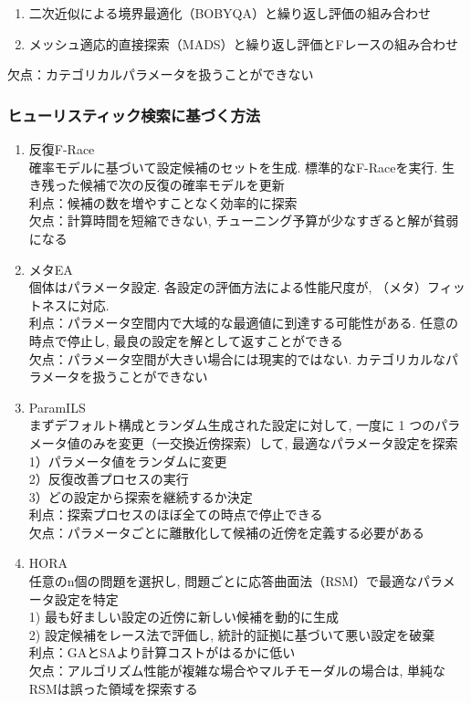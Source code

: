 \documentclass[twocolumn]{jarticle}     %
\begin{document}
\begin{enumerate}
  \item 二次近似による境界最適化（BOBYQA）と繰り返し評価の組み合わせ
  \item メッシュ適応的直接探索（MADS）と繰り返し評価とFレースの組み合わせ
\end{enumerate}

欠点：カテゴリカルパラメータを扱うことができない

\subsubsection{ヒューリスティック検索に基づく方法}

\begin{enumerate}
  \item 反復F-Race \\
  確率モデルに基づいて設定候補のセットを生成.
  標準的なF-Raceを実行.
  生き残った候補で次の反復の確率モデルを更新\\
  利点：候補の数を増やすことなく効率的に探索\\
  欠点：計算時間を短縮できない, チューニング予算が少なすぎると解が貧弱になる

  \item メタEA \\
  個体はパラメータ設定.
  各設定の評価方法による性能尺度が, （メタ）フィットネスに対応. \\
  利点：パラメータ空間内で大域的な最適値に到達する可能性がある. 任意の時点で停止し, 最良の設定を解として返すことができる\\
  欠点：パラメータ空間が大きい場合には現実的ではない. カテゴリカルなパラメータを扱うことができない

  \item ParamILS \\
  まずデフォルト構成とランダム生成された設定に対して, 一度に 1 つのパラメータ値のみを変更（一交換近傍探索）して, 最適なパラメータ設定を探索\\
  1）パラメータ値をランダムに変更\\
  2）反復改善プロセスの実行\\
  3）どの設定から探索を継続するか決定\\
  利点：探索プロセスのほぼ全ての時点で停止できる\\
  欠点：パラメータごとに離散化して候補の近傍を定義する必要がある

  \item HORA \\
  任意のn個の問題を選択し, 問題ごとに応答曲面法（RSM）で最適なパラメータ設定を特定\\
  1) 最も好ましい設定の近傍に新しい候補を動的に生成\\
  2) 設定候補をレース法で評価し, 統計的証拠に基づいて悪い設定を破棄\\
  利点：GAとSAより計算コストがはるかに低い\\
  欠点：アルゴリズム性能が複雑な場合やマルチモーダルの場合は, 単純なRSMは誤った領域を探索する
\end{enumerate}
\end{document}
